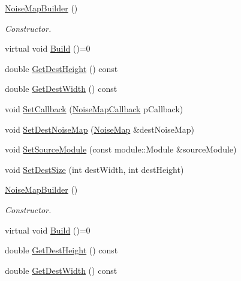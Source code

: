 \begin{DoxyCompactItemize}
\item 
\hyperlink{classnoise_1_1utils_1_1_noise_map_builder_adbbffa06dd4de296fbd0c8a395aa444b}{Noise\+Map\+Builder} ()
\begin{DoxyCompactList}\small\item\em Constructor. \end{DoxyCompactList}\item 
virtual void \hyperlink{classnoise_1_1utils_1_1_noise_map_builder_abe0e5f01c696c2290792c8f8736e3ed1}{Build} ()=0
\item 
double \hyperlink{classnoise_1_1utils_1_1_noise_map_builder_aef40bf8315cf974a468b1c8b5d0f857e}{Get\+Dest\+Height} () const 
\item 
double \hyperlink{classnoise_1_1utils_1_1_noise_map_builder_a911a54e1d86b59beaad313b54c7c715e}{Get\+Dest\+Width} () const 
\item 
void \hyperlink{classnoise_1_1utils_1_1_noise_map_builder_ac760187423eb5e16ac015f9beafd78ea}{Set\+Callback} (\hyperlink{namespacenoise_1_1utils_af10741a3394fadf8798a8f40b753b208}{Noise\+Map\+Callback} p\+Callback)
\item 
void \hyperlink{classnoise_1_1utils_1_1_noise_map_builder_a07555b64324efbb16f0ef244c4fed8b7}{Set\+Dest\+Noise\+Map} (\hyperlink{classnoise_1_1utils_1_1_noise_map}{Noise\+Map} \&dest\+Noise\+Map)
\item 
void \hyperlink{classnoise_1_1utils_1_1_noise_map_builder_aa39e8ea292711aa3a7627ddcaee4f12f}{Set\+Source\+Module} (const module\+::\+Module \&source\+Module)
\item 
void \hyperlink{classnoise_1_1utils_1_1_noise_map_builder_abad282f0cbe67824b73c580f611a7bd0}{Set\+Dest\+Size} (int dest\+Width, int dest\+Height)
\item 
\hyperlink{classnoise_1_1utils_1_1_noise_map_builder_a6a866e7ae94d27a34cc322e4d43cb51e}{Noise\+Map\+Builder} ()
\begin{DoxyCompactList}\small\item\em Constructor. \end{DoxyCompactList}\item 
virtual void \hyperlink{classnoise_1_1utils_1_1_noise_map_builder_abe0e5f01c696c2290792c8f8736e3ed1}{Build} ()=0
\item 
double \hyperlink{classnoise_1_1utils_1_1_noise_map_builder_aef40bf8315cf974a468b1c8b5d0f857e}{Get\+Dest\+Height} () const 
\item 
double \hyperlink{classnoise_1_1utils_1_1_noise_map_builder_a911a54e1d86b59beaad313b54c7c715e}{Get\+Dest\+Width} () const 

\end{DoxyCompactItemize}
